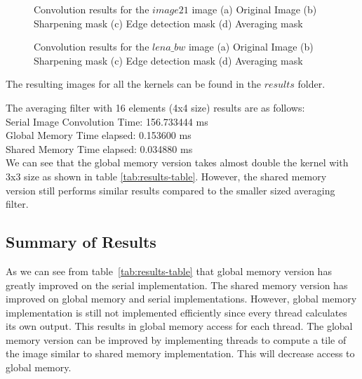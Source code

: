 \begin{figure}[H]
\centering
{} \hfill
{} \hfill
{} \hfill
{} \hfill
\caption{Convolution results for the $image21$ image  (a) Original Image (b) Sharpening mask (c) Edge detection mask (d) Averaging mask}
\label{fig:image21}
\end{figure}

\begin{figure}[H]
\centering
{} \hfill
{} \hfill
{} \hfill
{} \hfill
\caption{Convolution results for the $lena\_bw$ image (a) Original Image (b) Sharpening mask (c) Edge detection mask (d) Averaging mask}
\label{fig:lena}
\end{figure}

The resulting images for all the kernels can be found in the $results$ folder.

The averaging filter with 16 elements (4x4 size) results are as follows:\\
Serial Image Convolution Time: 156.733444 ms \\
Global Memory Time elapsed: 0.153600 ms \\
Shared Memory Time elapsed: 0.034880 ms \\

We can see that the global memory version takes almost double the kernel with 3x3 size as shown in table \ref{tab:results-table}. However, the shared memory version still performs similar results compared to the smaller sized averaging filter. 

\subsection{Summary of Results}
As we can see from table~\ref{tab:results-table} that global memory version has greatly improved on the serial implementation. The shared memory version has improved on global memory and serial implementations. However, global memory implementation is still not implemented efficiently since every thread calculates its own output. This results in global memory access for each thread. The global memory version can be improved by implementing threads to compute a tile of the image similar to shared memory implementation. This will decrease access to global memory. 


